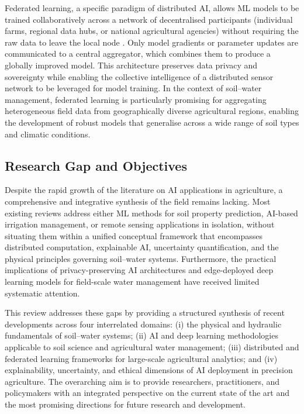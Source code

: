 \documentclass[land,article,submit,pdftex,moreauthors]{Definitions/mdpi}
\numberwithin{equation}{section}
\begin{document}
Federated learning, a specific paradigm of distributed AI, allows ML models to be trained collaboratively across a network of decentralised participants (individual farms, regional data hubs, or national agricultural agencies) without requiring the raw data to leave the local node \citep{mcmahan2017communication}. Only model gradients or parameter updates are communicated to a central aggregator, which combines them to produce a globally improved model. This architecture preserves data privacy and sovereignty while enabling the collective intelligence of a distributed sensor network to be leveraged for model training. In the context of soil--water management, federated learning is particularly promising for aggregating heterogeneous field data from geographically diverse agricultural regions, enabling the development of robust models that generalise across a wide range of soil types and climatic conditions.

\subsection{Research Gap and Objectives}

Despite the rapid growth of the literature on AI applications in agriculture, a comprehensive and integrative synthesis of the field remains lacking. Most existing reviews address either ML methods for soil property prediction, AI-based irrigation management, or remote sensing applications in isolation, without situating them within a unified conceptual framework that encompasses distributed computation, explainable AI, uncertainty quantification, and the physical principles governing soil--water systems. Furthermore, the practical implications of privacy-preserving AI architectures and edge-deployed deep learning models for field-scale water management have received limited systematic attention.

This review addresses these gaps by providing a structured synthesis of recent developments across four interrelated domains: (i) the physical and hydraulic fundamentals of soil--water systems; (ii) AI and deep learning methodologies applicable to soil science and agricultural water management; (iii) distributed and federated learning frameworks for large-scale agricultural analytics; and (iv) explainability, uncertainty, and ethical dimensions of AI deployment in precision agriculture. The overarching aim is to provide researchers, practitioners, and policymakers with an integrated perspective on the current state of the art and the most promising directions for future research and development.
\end{document}
